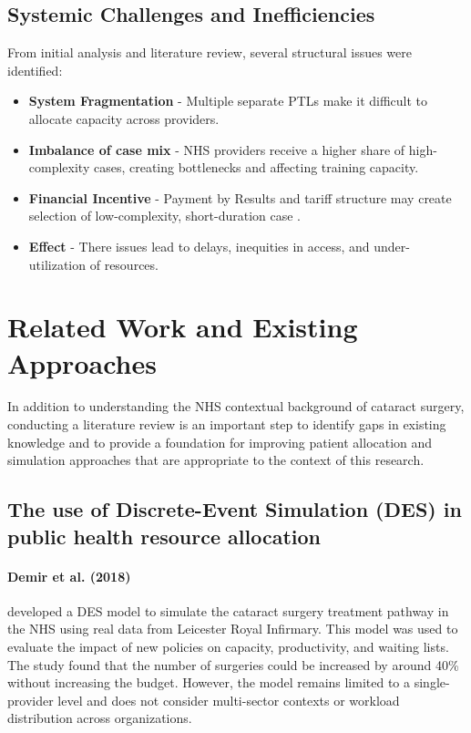 \documentclass[ %
                    author={Nattanan Nawakitbamrung},
                supervisor={Dr. Sébastien Rochat},
                    degree={MSc},
                     title={Developing and Evaluating the Impact of a Single Patient Treatment List (PTL) for an NHS Integrated Care System},
                  subtitle={},
                      type={},
                      year={2025}]{dissertation}
\begin{document}
\subsection{Systemic Challenges and Inefficiencies}
From initial analysis and literature review, several structural issues were identified:
\begin{itemize}
    \item \textbf{System Fragmentation} - Multiple separate PTLs make it difficult to allocate capacity across providers.
    \item \textbf{Imbalance of case mix} - NHS providers receive a higher share of high-complexity cases, creating bottlenecks and affecting training capacity.
    \item \textbf{Financial Incentive} - Payment by Results and tariff structure may create selection of low-complexity, short-duration case \cite{elalouf2013fair, rawls1971theory}.
    \item \textbf{Effect} - There issues lead to delays, inequities in access, and under-utilization of resources.
\end{itemize}

\section{Related Work and Existing Approaches}
In addition to understanding the NHS contextual background of cataract surgery, conducting a literature review is an important step to identify gaps in existing knowledge and to provide a foundation for improving patient allocation and simulation approaches that are appropriate to the context of this research.

\subsection{The use of Discrete-Event Simulation (DES) in public health resource allocation}
\paragraph{Demir et al. (2018)} \cite{demir2018des} developed a DES model to simulate the cataract surgery treatment pathway in the NHS using real data from Leicester Royal Infirmary. This model was used to evaluate the impact of new policies on capacity, productivity, and waiting lists. The study found that the number of surgeries could be increased by around 40\% without increasing the budget. However, the model remains limited to a single-provider level and does not consider multi-sector contexts or workload distribution across organizations.
\end{document}
